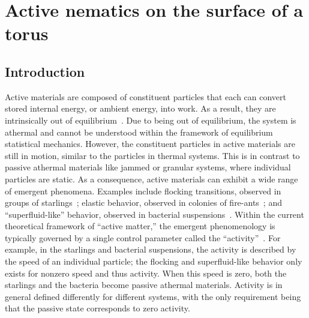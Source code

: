 \chapter{Active nematics on the surface of a torus}\label{c:3}
\section{Introduction}
Active materials are composed of constituent particles that each can convert stored internal energy, or ambient energy, into work.
As a result, they are intrinsically out of equilibrium~\cite{RN237,RN238,RN40}.
Due to being out of equilibrium, the system is athermal and cannot be understood within the framework of equilibrium statistical mechanics.
However, the constituent particles in active materials are still in motion, similar to the particles in thermal systems.
This is in contrast to passive athermal materials like jammed or granular systems, where individual particles are static.
As a consequence, active materials can exhibit a wide range of emergent phenomena.
Examples include flocking transitions, observed in groups of starlings~\cite{RN239,RN240}; elastic behavior, observed in colonies of fire-ants~\cite{RN242}; and ``superfluid-like'' behavior, observed in bacterial suspensions~\cite{RN270,RN271}.
Within the current theoretical framework of ``active matter,'' the emergent phenomenology is typically governed by a single control parameter called the ``activity''~\cite{RN237,RN238,RN40}.
For example, in the starlings and bacterial suspensions, the activity is described by the speed of an individual particle; the flocking and superfluid-like behavior only exists for nonzero speed and thus activity.
When this speed is zero, both the starlings and the bacteria become passive athermal materials.
Activity is in general defined differently for different systems, with the only requirement being that the passive state corresponds to zero activity.


